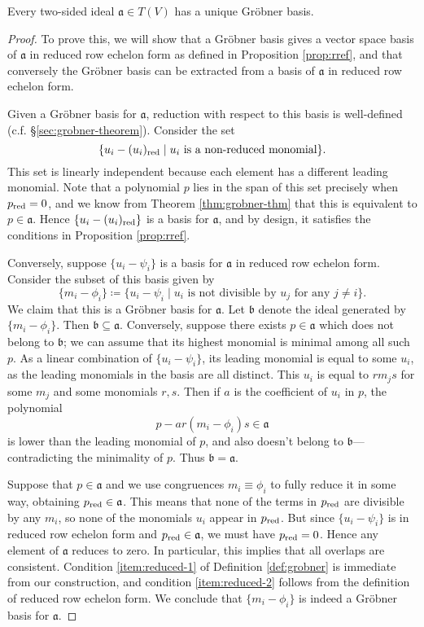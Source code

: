 \begin{thm}\label{thm:exist+unique}
	Every two-sided ideal $\mathfrak{a}\in T(V)$ has a unique Gr\"obner basis.
\end{thm}
\begin{proof}
	To prove this, we will show that a Gr\"obner basis gives a vector space basis of $\mathfrak{a}$ in reduced row echelon form as defined in Proposition \ref{prop:rref}, and that conversely the Gr\"obner basis can be extracted from a basis of $\mathfrak{a}$ in reduced row echelon form.
	
	Given a Gr\"obner basis for $\mathfrak{a}$, reduction with respect to this basis is well-defined (c.f. \S\ref{sec:grobner-theorem}). Consider the set
	\[
		\{u_i - (u_i)_{\mathrm{red}} \mid u_i \text{ is a non-reduced monomial}\}.
	\]
	This set is linearly independent because each element has a different leading monomial. Note that a polynomial $p$ lies in the span of this set precisely when $p_{\mathrm{red}} = 0$, and we know from Theorem \ref{thm:grobner-thm} that this is equivalent to $p \in \mathfrak{a}$. Hence $\{u_i - (u_i)_{\mathrm{red}}\}$ is a basis for $\mathfrak{a}$, and by design, it satisfies the conditions in Proposition \ref{prop:rref}.
	
	Conversely, suppose $\{u_i - \psi_i\}$ is a basis for $\mathfrak{a}$ in reduced row echelon form. Consider the subset of this basis given by
	\[
		\{m_i - \phi_i\} \coloneqq \{u_i - \psi_i \mid u_i \text{ is not divisible by } u_j \text{ for any }j\neq i\}.
	\]
	We claim that this is a Gr\"obner basis for $\mathfrak{a}$. Let $\mathfrak{b}$ denote the ideal generated by $\{m_i -\phi_i\}$. Then $\mathfrak{b} \subseteq \mathfrak{a}$. Conversely, suppose there exists $p\in \mathfrak{a}$ which does not belong to $\mathfrak{b}$; we can assume that its highest monomial is minimal among all such $p$. As a linear combination of $\{u_i - \psi_i\}$, its leading monomial is equal to some $u_i$, as the leading monomials in the basis are all distinct. This $u_i$ is equal to $rm_j s$ for some $m_j$ and some monomials $r,s$. Then if $a$ is the coefficient of $u_i$ in $p$, the polynomial
	\[
		p - ar(m_i -\phi_i)s \in \mathfrak{a}
	\]
	is lower than the leading monomial of $p$, and also doesn't belong to $\mathfrak{b}$---contradicting the minimality of $p$. Thus $\mathfrak{b} = \mathfrak{a}$.
	
	Suppose that $p\in \mathfrak{a}$ and we use congruences $m_i \equiv \phi_i$ to fully reduce it in some way, obtaining $p_{\mathrm{red}} \in \mathfrak{a}$. This means that none of the terms in $p_{\mathrm{red}}$ are divisible by any $m_i$, so none of the monomials $u_i$ appear in $p_{\mathrm{red}}$. But since $\{u_i - \psi_i\}$ is in reduced row echelon form and $p_{\mathrm{red}} \in \mathfrak{a}$, we must have $p_{\mathrm{red}} = 0$. Hence any element of $\mathfrak{a}$ reduces to zero. In particular, this implies that all overlaps are consistent. Condition \eqref{item:reduced-1} of Definition \ref{def:grobner} is immediate from our construction, and condition \eqref{item:reduced-2} follows from the definition of reduced row echelon form. We conclude that $\{m_i - \phi_i\}$ is indeed a Gr\"obner basis for $\mathfrak{a}$.
	

\end{proof}
